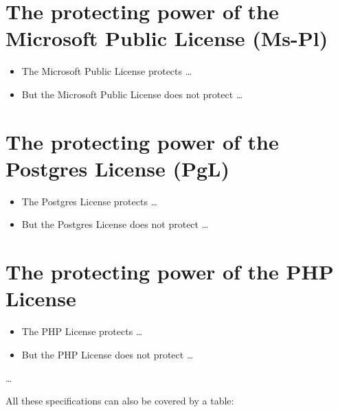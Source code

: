 \section{The protecting power of the Microsoft Public License (Ms-Pl)}
\begin{itemize} 
  \item The Microsoft Public License protects \ldots
  \item But the Microsoft Public License does not protect \ldots
\end{itemize}

\section{The protecting power of the Postgres License (PgL)}
\begin{itemize} 
  \item The Postgres License protects \ldots
  \item But the Postgres License does not protect \ldots
\end{itemize}

\section{The protecting power of the PHP License}
\begin{itemize} 
  \item The PHP License protects \ldots
  \item But the PHP License does not protect \ldots
\end{itemize}  
 
\ldots

All these specifications can also be covered by a table:

